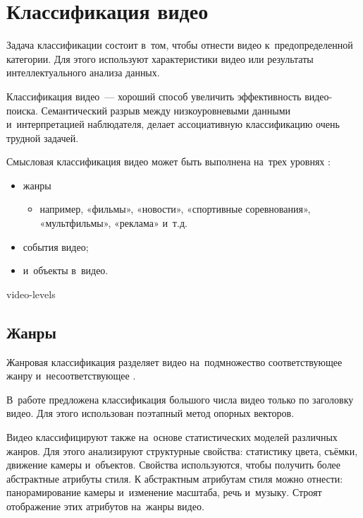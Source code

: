 

\section{Классификация видео}

Задача классификации состоит в~том,
чтобы отнести видео к~предопределенной категории.
Для этого используют характеристики видео или
результаты интеллектуального анализа данных.

Классификация видео~— хороший способ увеличить
эффективность видео-поиска.
Семантический разрыв между низкоуровневыми данными
и~интерпретацией наблюдателя, делает ассоциативную классификацию
очень трудной задачей.

Смысловая классификация видео может быть выполнена
на~трех уровнях \cite{Tamizharasan:2013}:
\begin{itemize}
    \item жанры
    \begin{itemize}
        \item например, «фильмы», «новости»,
                «спортивные соревнования», «мультфильмы», «реклама» и~т.д.
    \end{itemize}
    \item события видео;
    \item и~объекты в~видео.
\end{itemize}


\begin{figuredt}
    {video-levels}
\end{figuredt}



\subsection{Жанры}

Жанровая классификация разделяет видео на~подмножество соответствующее жанру
и~несоответствующее \cite{Wu:2012}.

В~работе \cite{Jiang:2007} предложена классификация большого числа
видео только по заголовку видео.
Для этого использован поэтапный метод опорных
векторов.

Видео классифицируют также на~основе статистических моделей различных жанров.
Для этого анализируют структурные свойства:
статистику цвета, съёмки, движение камеры и~объектов.
Свойства используются, чтобы получить более абстрактные атрибуты стиля.
К абстрактным атрибутам стиля можно отнести:
панорамирование камеры и~изменение масштаба, речь и~музыку.
Строят отображение этих атрибутов на~жанры видео.

